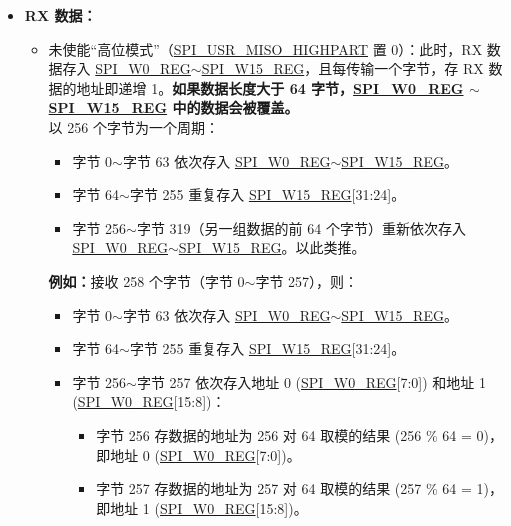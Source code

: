 \documentclass[main\_\_CN.tex]{subfiles}
\begin{document}
\begin{itemize}
\begin{itemize}
    \end{itemize}
    \item \textbf{RX 数据：}
    \begin{itemize}
        \item 未使能“高位模式”（\hyperref[fielddesc:SPIUSRMISOHIGHPART]{SPI\_USR\_MISO\_HIGHPART} 置 0）：此时，RX 数据存入 \hyperref[regdesc:SPIW0REG]{SPI\_W0\_REG}$\sim$\hyperref[regdesc:SPIW15REG]{SPI\_W15\_REG}，且每传输一个字节，存 RX 数据的地址即递增 1。\textbf{如果数据长度大于 64 字节，\hyperref[regdesc:SPIW0REG]{SPI\_W0\_REG} $\sim$ \hyperref[regdesc:SPIW15REG]{SPI\_W15\_REG} 中的数据会被覆盖。}\\
        以 256 个字节为一个周期：
        \begin{itemize}
            \item 字节 0$\sim$字节 63 依次存入 \hyperref[regdesc:SPIW0REG]{SPI\_W0\_REG}$\sim$\hyperref[regdesc:SPIW15REG]{SPI\_W15\_REG}。
            \item 字节 64$\sim$字节 255 重复存入 \hyperref[regdesc:SPIW15REG]{SPI\_W15\_REG}[31:24]。
            \item 字节 256$\sim$字节 319（另一组数据的前 64 个字节）重新依次存入 \hyperref[regdesc:SPIW0REG]{SPI\_W0\_REG}$\sim$\hyperref[regdesc:SPIW15REG]{SPI\_W15\_REG}。以此类推。
        \end{itemize}
        \textbf{例如：}接收 258 个字节（字节 0$\sim$字节 257），则：
        \begin{itemize}
            \item 字节 0$\sim$字节 63 依次存入 \hyperref[regdesc:SPIW0REG]{SPI\_W0\_REG}$\sim$\hyperref[regdesc:SPIW15REG]{SPI\_W15\_REG}。
            \item 字节 64$\sim$字节 255 重复存入 \hyperref[regdesc:SPIW15REG]{SPI\_W15\_REG}[31:24]。
            \item 字节 256$\sim$字节 257 依次存入地址 0 (\hyperref[regdesc:SPIW0REG]{SPI\_W0\_REG}[7:0]) 和地址 1 (\hyperref[regdesc:SPIW0REG]{SPI\_W0\_REG}[15:8])：
            \begin{itemize}
                \item 字节 256 存数据的地址为 256 对 64 取模的结果 (256 \% 64 = 0)，即地址 0 (\hyperref[regdesc:SPIW0REG]{SPI\_W0\_REG}[7:0])。
                \item 字节 257 存数据的地址为 257 对 64 取模的结果 (257 \% 64 = 1)，即地址 1 (\hyperref[regdesc:SPIW0REG]{SPI\_W0\_REG}[15:8])。
            \end{itemize}
        \end{itemize}

\end{itemize}
\end{itemize}
\end{document}
